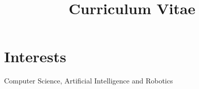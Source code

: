 \documentclass[11pt,a4paper,sans]{moderncv} %
\title{Curriculum Vitae}
\begin{document}











\makecvtitle %




 \section{Interests}
 Computer Science,
 Artificial Intelligence
 and 
 Robotics
 

\end{document}

